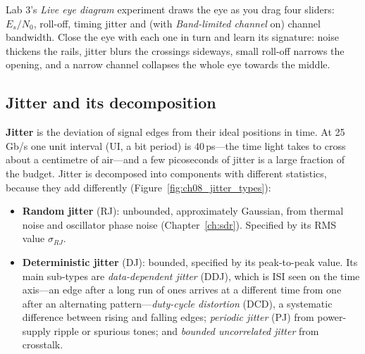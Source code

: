 
\begin{tryit}
Lab 3's \emph{Live eye diagram} experiment draws the eye as you drag four sliders: $E_s/N_0$,
roll-off, timing jitter and (with \emph{Band-limited channel} on) channel bandwidth. Close the eye
with each one in turn and learn its signature: noise thickens the rails, jitter blurs the crossings
sideways, small roll-off narrows the opening, and a narrow channel collapses the whole eye towards
the middle.
\end{tryit}

\subsection{Jitter and its decomposition}
\label{sec:ch08:jitter}


\textbf{Jitter} is the deviation of signal edges from their ideal positions in
time. At 25\,Gb/s one unit interval (UI, a bit period) is 40\,ps---the time light takes to cross
about a centimetre of air---and a few picoseconds of jitter is a large fraction of the budget.
Jitter is decomposed into components with different statistics, because they add differently
(Figure~\ref{fig:ch08_jitter_types}):
\begin{itemize}
\item \textbf{Random jitter} (RJ): unbounded, approximately Gaussian, from
thermal noise and oscillator phase noise (Chapter~\ref{ch:sdr}). Specified by its RMS value
$\sigma_{RJ}$.
\item \textbf{Deterministic jitter} (DJ): bounded, specified by its
peak-to-peak value. Its main sub-types are \emph{data-dependent jitter} (DDJ), which is ISI seen
on the time axis---an edge after a long run of ones arrives at a different time from one after
an alternating pattern---\emph{duty-cycle distortion} (DCD), a systematic difference between
rising and falling edges; \emph{periodic jitter} (PJ) from power-supply ripple or spurious
tones; and \emph{bounded uncorrelated jitter} from crosstalk.
\end{itemize}


